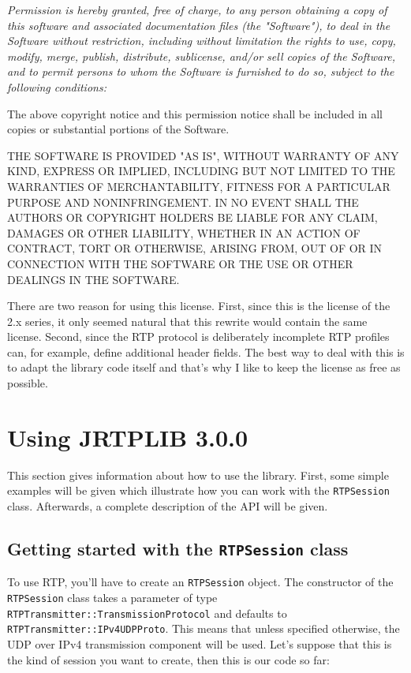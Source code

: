 \documentclass[12pt,a4paper]{article}
\newcommand{\jversion}{3.0.0}
\begin{document}
			{\em Permission is hereby granted, free of charge, to any person
			obtaining a copy of this software and associated documentation files
			(the "Software"), to deal in the Software without restriction,
			including without limitation the rights to use, copy, modify, merge,
			publish, distribute, sublicense, and/or sell copies of the Software,
			and to permit persons to whom the Software is furnished to do so,
			subject to the following conditions:

			The above copyright notice and this permission notice shall be
			included in all copies or substantial portions of the Software.

			THE SOFTWARE IS PROVIDED "AS IS", WITHOUT WARRANTY OF ANY
			KIND, EXPRESS OR IMPLIED, INCLUDING BUT NOT LIMITED TO THE
			WARRANTIES OF MERCHANTABILITY, FITNESS FOR A PARTICULAR PURPOSE AND
			NONINFRINGEMENT. IN NO EVENT SHALL THE AUTHORS OR COPYRIGHT HOLDERS
			BE LIABLE FOR ANY CLAIM, DAMAGES OR OTHER LIABILITY, WHETHER IN AN
			ACTION OF CONTRACT, TORT OR OTHERWISE, ARISING FROM, OUT OF OR IN
			CONNECTION WITH THE SOFTWARE OR THE USE OR OTHER DEALINGS IN THE
			SOFTWARE.}

		There are two reason for using this license. First, since this is the
		license of the 2.x series, it only seemed natural that this rewrite
		would contain the same license. Second, since the RTP protocol is
		deliberately incomplete RTP profiles can, for example, define additional
		header fields. The best way to deal with this is to adapt the library
		code itself and that's why I like to keep the license as free as
		possible.

	\section{Using JRTPLIB \jversion}
		
		This section gives information about how to use the library. First, some
		simple examples will be given which illustrate how you can work with the
		{\tt RTPSession} class. Afterwards, a complete description of the API
		will be given.

		\subsection{Getting started with the {\tt RTPSession} class}

			To use RTP, you'll have to create an {\tt RTPSession} object. The
			constructor of the {\tt RTPSession} class takes a parameter of
			type {\tt RTPTrans\-mitter::Trans\-mission\-Protocol} and defaults
			to {\tt RTPTrans\-mitter::IPv4UDPProto}. This means that unless
			specified otherwise, the UDP over IPv4 transmission component will
			be used. Let's suppose that this is the kind of session you want to
			create, then this is our code so far:
\end{document}
